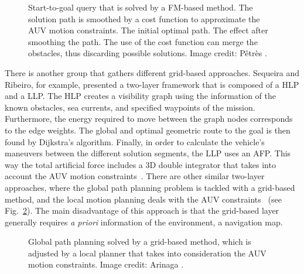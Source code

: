 \begin{figure}[htbp]
    \myfloatalign
     \quad
     \quad
\caption[FM-based planning for AUVs under motion constraints.]
{Start-to-goal query that is solved by a FM-based method. The solution path is
smoothed by a cost function to approximate the AUV motion constraints.
\protect {} The initial optimal path.
\protect {} The effect after smoothing the
path.
\protect {} The use of the cost function
can merge the obstacles, thus discarding possible solutions. Image credit:
Pêtrès \etal\cite{Petres2007}.}
\label{fig:CostFunctionConstrainedAUV}
\end{figure}

There is another group that gathers different grid-based approaches. Sequeira
and Ribeiro, for example, presented a two-layer framework that is composed of a
\ac{HLP} and a \ac{LLP}. The \ac{HLP} creates a visibility graph using the
information of the known obstacles, sea currents, and specified waypoints of the
mission. Furthermore, the energy required to move between the graph nodes
corresponds to the edge weights. The global and optimal geometric route to the
goal is then found by Dijkstra's algorithm. Finally, in order to calculate the
vehicle's maneuvers between the different solution segments, the \ac{LLP} uses
an \ac{AFP}. This way the total artificial force includes a \ac{3D} double
integrator that takes into account the \ac{AUV} motion
constraints~\cite{Sequeira1994}. There are other similar two-layer approaches,
where the global path planning problem is tackled with a grid-based method, and
the local motion planning deals with the \ac{AUV}
constraints~\cite{Arinaga1996} (see Fig.~\ref{fig:GridBasedLocalConstrAUV}). The
main disadvantage of this approach is that the grid-based layer generally
requires \textit{a priori} information of the environment, \eg a navigation map.

\begin{figure}[htbp]
    \myfloatalign
     \quad
\caption[Combination of a grid-based planning method and a local planner
to include the AUV motion constraints.]
{\protect {} Global path planning solved by
a grid-based method, \protect {} which is
adjusted by a local planner that takes into consideration the AUV motion
constraints. Image credit: Arinaga \etal\cite{Arinaga1996}.}
\label{fig:GridBasedLocalConstrAUV}
\end{figure}

